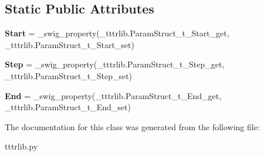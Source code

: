 \subsection*{Static Public Attributes}
\begin{DoxyCompactItemize}
\item 
\mbox{\label{classtttrlib_1_1_param_struct__t_ae3bb5d02c37bb5e187ae9e6ce3d14930}} 
{\bfseries Start} = \+\_\+swig\+\_\+property(\+\_\+tttrlib.\+Param\+Struct\+\_\+t\+\_\+\+Start\+\_\+get, \+\_\+tttrlib.\+Param\+Struct\+\_\+t\+\_\+\+Start\+\_\+set)
\item 
\mbox{\label{classtttrlib_1_1_param_struct__t_a8c4ee55a1496e802cc6c35c9dc0a3783}} 
{\bfseries Step} = \+\_\+swig\+\_\+property(\+\_\+tttrlib.\+Param\+Struct\+\_\+t\+\_\+\+Step\+\_\+get, \+\_\+tttrlib.\+Param\+Struct\+\_\+t\+\_\+\+Step\+\_\+set)
\item 
\mbox{\label{classtttrlib_1_1_param_struct__t_a9fd68d48b0e9e4d29b08508784213b5f}} 
{\bfseries End} = \+\_\+swig\+\_\+property(\+\_\+tttrlib.\+Param\+Struct\+\_\+t\+\_\+\+End\+\_\+get, \+\_\+tttrlib.\+Param\+Struct\+\_\+t\+\_\+\+End\+\_\+set)
\end{DoxyCompactItemize}


The documentation for this class was generated from the following file\+:\begin{DoxyCompactItemize}
\item 
tttrlib.\+py\end{DoxyCompactItemize}

